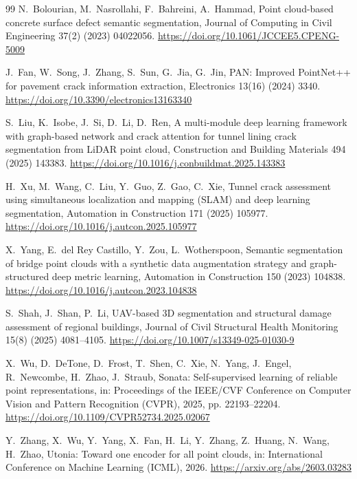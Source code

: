 \documentclass[5p]{elsarticle}
\begin{document}
\begin{thebibliography}{99}
 N.~Bolourian, M.~Nasrollahi, F.~Bahreini, A.~Hammad, Point cloud-based concrete surface defect semantic segmentation, Journal of Computing in Civil Engineering 37(2) (2023) 04022056. \url{https://doi.org/10.1061/JCCEE5.CPENG-5009}

 J.~Fan, W.~Song, J.~Zhang, S.~Sun, G.~Jia, G.~Jin, PAN: Improved PointNet++ for pavement crack information extraction, Electronics 13(16) (2024) 3340. \url{https://doi.org/10.3390/electronics13163340}

 S.~Liu, K.~Isobe, J.~Si, D.~Li, D.~Ren, A multi-module deep learning framework with graph-based network and crack attention for tunnel lining crack segmentation from LiDAR point cloud, Construction and Building Materials 494 (2025) 143383. \url{https://doi.org/10.1016/j.conbuildmat.2025.143383}

 H.~Xu, M.~Wang, C.~Liu, Y.~Guo, Z.~Gao, C.~Xie, Tunnel crack assessment using simultaneous localization and mapping (SLAM) and deep learning segmentation, Automation in Construction 171 (2025) 105977. \url{https://doi.org/10.1016/j.autcon.2025.105977}

 X.~Yang, E.~del Rey Castillo, Y.~Zou, L.~Wotherspoon, Semantic segmentation of bridge point clouds with a synthetic data augmentation strategy and graph-structured deep metric learning, Automation in Construction 150 (2023) 104838. \url{https://doi.org/10.1016/j.autcon.2023.104838}

 S.~Shah, J.~Shan, P.~Li, UAV-based 3D segmentation and structural damage assessment of regional buildings, Journal of Civil Structural Health Monitoring 15(8) (2025) 4081--4105. \url{https://doi.org/10.1007/s13349-025-01030-9}


 X.~Wu, D.~DeTone, D.~Frost, T.~Shen, C.~Xie, N.~Yang, J.~Engel, R.~Newcombe, H.~Zhao, J.~Straub, Sonata: Self-supervised learning of reliable point representations, in: Proceedings of the IEEE/CVF Conference on Computer Vision and Pattern Recognition (CVPR), 2025, pp. 22193--22204. \url{https://doi.org/10.1109/CVPR52734.2025.02067}

 Y.~Zhang, X.~Wu, Y.~Yang, X.~Fan, H.~Li, Y.~Zhang, Z.~Huang, N.~Wang, H.~Zhao, Utonia: Toward one encoder for all point clouds, in: International Conference on Machine Learning (ICML), 2026. \url{https://arxiv.org/abs/2603.03283}

\end{thebibliography}
\end{document}
